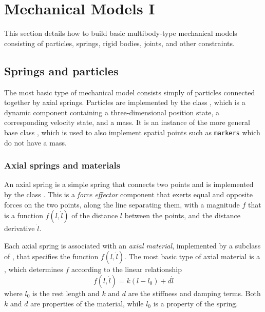 \ifdefined\maindoc\else
\def\doctitle{Mechanical Models I}

\mainmatter
\fi

\chapter{Mechanical Models I}
\label{MechModelsI:sec}

This section details how to build basic multibody-type mechanical
models consisting of particles, springs, rigid bodies, joints, and
other constraints.

\section{Springs and particles}
\label{ParticlesAndSprings:sec}

The most basic type of mechanical model consists simply of particles
connected together by axial springs.  Particles are implemented by the
class , which is a
dynamic component containing a three-dimensional position state, a
corresponding velocity state, and a mass. It is an instance of the
more general base class ,
which is used to also implement spatial points such as {\tt markers}
which do not have a mass.

\subsection{Axial springs and materials}
\label{AxialSprings:sec}

An axial spring is a simple spring that connects two points and is
implemented by the class
. This is a {\it
force effector} component that exerts equal and opposite forces on the
two points, along the line separating them, with a magnitude $f$ that
is a function $f(l, \dot l)$ of the distance $l$ between the points,
and the distance derivative $\dot l$.

Each axial spring is associated with an {\it axial material},
implemented by a subclass of
, that specifies
the function $f(l, \dot l)$. The most basic type of axial material is
a , which
determines $f$ according to the linear relationship
%
\begin{equation}
f(l, \dot l) = k (l-l_0) + d \dot l
\end{equation}
%
where $l_0$ is the rest length and $k$ and $d$ are the stiffness and
damping terms. Both $k$ and $d$ are properties of the material, while
$l_0$ is a property of the spring.

